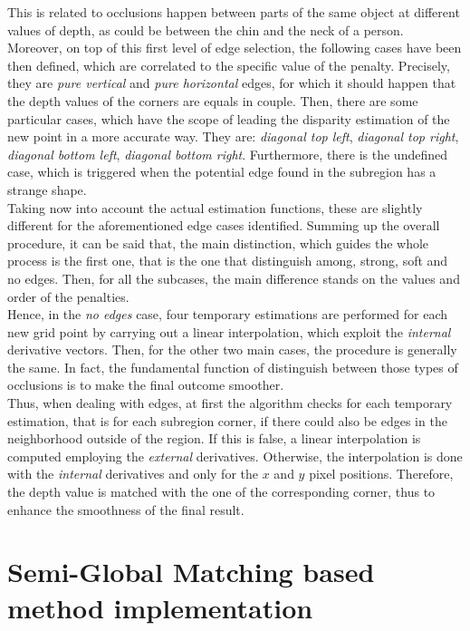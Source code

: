 This is related to occlusions happen between parts of the same object at different values of depth, as could be between the chin and the neck of a person.\\
Moreover, on top of this first level of edge selection, the following cases have been then defined, which are correlated to the specific value of the penalty.
Precisely, they are \textit{pure vertical} and \textit{pure horizontal} edges, for which it should happen that the depth values of the corners are equals in couple.
Then, there are some particular cases, which have the scope of leading the disparity estimation of the new point in a more accurate way.
They are: \textit{diagonal top left}, \textit{diagonal top right}, \textit{diagonal bottom left}, \textit{diagonal bottom right}.
Furthermore, there is the undefined case, which is triggered when the potential edge found in the subregion has a strange shape.\\
Taking now into account the actual estimation functions, these are slightly different for the aforementioned edge cases identified.
Summing up the overall procedure, it can be said that, the main distinction, which guides the whole process is the first one, that is the one that distinguish among, strong, soft and no edges.
Then, for all the subcases, the main difference stands on the values and order of the penalties. \\
Hence, in the \textit{no edges} case, four temporary estimations are performed for each new grid point by carrying out a linear interpolation, which exploit the \textit{internal} derivative vectors.
Then, for the other two main cases, the procedure is generally the same. 
In fact, the fundamental function of distinguish between those types of occlusions is to make the final outcome smoother. \\
Thus, when dealing with edges, at first the algorithm checks for each temporary estimation, that is for each subregion corner, if there could also be edges in the neighborhood outside of the region. 
If this is false, a linear interpolation is computed employing the \textit{external} derivatives.
Otherwise, the interpolation is done with the \textit{internal} derivatives and only for the $x$ and $y$ pixel positions. 
Therefore, the depth value is matched with the one of the corresponding corner, thus to enhance the smoothness of the final result.

\section{Semi-Global Matching based method implementation}
\label{section:sgm-based}


